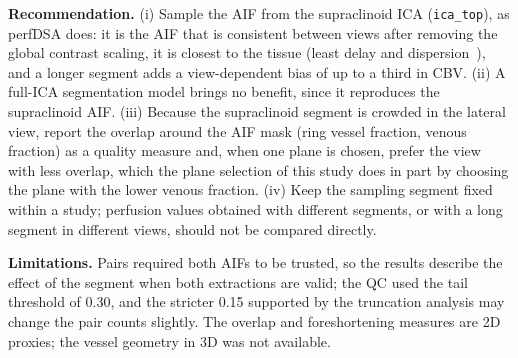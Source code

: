 \textbf{Recommendation.}
(i) Sample the AIF from the supraclinoid ICA (\texttt{ica\_top}), as perfDSA does: it is the AIF that is
consistent between views after removing the global contrast scaling, it is closest to the tissue (least delay
and dispersion~\cite{calamante2000}), and a longer segment adds a view-dependent bias of up to a third in CBV.
(ii) A full-ICA segmentation model brings no benefit, since it reproduces the supraclinoid AIF.
(iii) Because the supraclinoid segment is crowded in the lateral view, report the overlap around the AIF mask
(ring vessel fraction, venous fraction) as a quality measure and, when one plane is chosen, prefer the view with
less overlap, which the plane selection of this study does in part by choosing the plane with the lower venous
fraction.
(iv) Keep the sampling segment fixed within a study; perfusion values obtained with different segments, or with
a long segment in different views, should not be compared directly.

\textbf{Limitations.} Pairs required both AIFs to be trusted, so the results describe the effect of the segment
when both extractions are valid; the QC used the tail threshold of 0.30, and the stricter 0.15 supported by the
truncation analysis may change the pair counts slightly. The overlap and foreshortening measures are 2D proxies;
the vessel geometry in 3D was not available.
